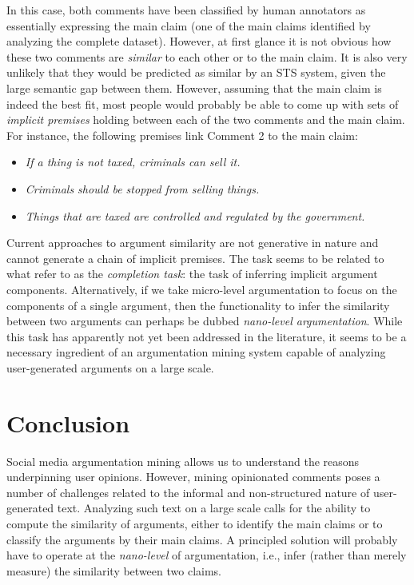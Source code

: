 \documentclass[11pt]{article}
\begin{document}
In this case, both comments have been classified by human annotators as
essentially expressing the main claim (one of the main claims identified by
analyzing the complete dataset). However, at first glance it is not obvious how
these two comments are \emph{similar} to each other or to the main claim. It is
also very unlikely that they would be predicted as similar by an STS system, given
the large semantic gap between them. However, assuming that the main claim is
indeed the best fit, most people would probably be able to come up with sets
of \emph{implicit premises} holding between each of the two comments and the main claim. For instance, the following premises link Comment 2 to the main claim:

\begin{itemize}
\setlength\itemsep{0.1em}
\item \emph{If a thing is not taxed, criminals can sell it.}
\item \emph{Criminals should be stopped from selling things.}
\item \emph{Things that are taxed are controlled and regulated by the government.}
\end{itemize}

Current approaches to argument similarity are not generative in nature and
cannot generate a chain of implicit premises.  The task seems to be related to
what  refer to as the \emph{completion task}: the
task of inferring implicit argument components. Alternatively, if we take micro-level
argumentation to focus on the components of a single argument, then the
functionality to infer the similarity between two arguments can perhaps be
dubbed \emph{nano-level argumentation}.  While this task has apparently not yet
been addressed in the literature, it seems to be a necessary ingredient of an
argumentation mining system capable of analyzing user-generated arguments on a
large scale.  

\section{Conclusion}

Social media argumentation mining allows us to understand the reasons
underpinning user opinions. However, mining opinionated comments poses a number
of challenges related to the informal and non-structured nature of
user-generated text. Analyzing such text on a large scale calls for the ability
to compute the similarity of arguments, either to identify the main claims or
to classify the arguments by their main claims. A principled solution will
probably have to operate at the \emph{nano-level} of argumentation, i.e., infer
(rather than merely measure) the similarity between two claims.



\end{document}
